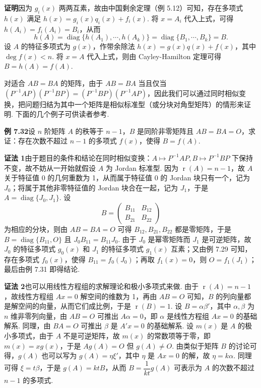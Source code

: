 \documentclass[UTF8,12pt,a4paper,fontset=fandol]{ctexart}
\begin{document}
\noindent\textbf{证明}\quad 因为 $g_i(x)$ 两两互素，故由中国剩余定理（例 5.12）可知，存在多项式 $h(x)$ 满足 $h(x)=g_i(x)q_i(x)+f_i(x)$. 将 $x=A_i$ 代入上式，可得 $h(A_i)=f_i(A_i)=B_i$，从而
\[
h(A)=\operatorname{diag}\{h(A_1),\cdots,h(A_k)\}
=\operatorname{diag}\{B_1,\cdots,B_k\}=B.
\]
设 $A$ 的特征多项式为 $g(x)$，作带余除法 $h(x)=g(x)q(x)+f(x)$，其中 $\deg f(x)<n$. 将 $x=A$ 代入上式，则由 Cayley-Hamilton 定理可得 $B=h(A)=f(A)$.

对适合 $AB=BA$ 的矩阵，由于 $AB=BA$ 当且仅当 $(P^{-1}AP)(P^{-1}BP)=(P^{-1}BP)(P^{-1}AP)$，因此我们可以通过同时相似变换，把问题归结为其中一个矩阵是相似标准型（或分块对角型矩阵）的情形来证明. 下面的几个例子可供读者参考.

\noindent\textbf{例 7.32}\quad 设 $n$ 阶矩阵 $A$ 的秩等于 $n-1$，$B$ 是同阶非零矩阵且 $AB=BA=O$，求证：存在次数不超过 $n-1$ 的多项式 $f(x)$，使得 $B=f(A)$.

\noindent\textbf{证法 1}\quad 由于题目的条件和结论在同时相似变换：$A\mapsto P^{-1}AP,B\mapsto P^{-1}BP$ 下保持不变，故不妨从一开始就假设 $A$ 为 Jordan 标准型. 因为 $\operatorname{r}(A)=n-1$，故 $A$ 关于特征值 0 的几何重数为 1，从而属于特征值 0 的 Jordan 块只有一个，记为 $J_0$；将属于其他非零特征值的 Jordan 块合在一起，记为 $J_1$，于是 $A=\operatorname{diag}\{J_0,J_1\}$. 设
\[
B=\left(\begin{array}{cc}
B_{11} & B_{12}\\
B_{21} & B_{22}
\end{array}\right)
\]
为相应的分块，则由 $AB=BA=O$ 可得 $B_{12},B_{21},B_{22}$ 都是零矩阵，于是 $B=\operatorname{diag}\{B_{11},O\}$ 且 $J_0B_{11}=B_{11}J_0$. 由于 $J_0$ 是幂零矩阵而 $J_1$ 是可逆矩阵，故 $J_0$ 的特征多项式 $g_0(x)$ 和 $J_1$ 的特征多项式 $g_1(x)$ 互素；又由例 7.29 可知，存在多项式 $f_0(x)$，使得 $B_{11}=f_0(J_0)$；再取 $f_1(x)=0$，则 $O=f_1(J_1)$；最后由例 7.31 即得结论.

\noindent\textbf{证法 2}\quad 也可以用线性方程组的求解理论和极小多项式来做. 由于 $\operatorname{r}(A)=n-1$，故线性方程组 $Ax=0$ 解空间的维数为 1，再由 $AB=O$ 可知，$B$ 的列向量都是解空间的向量，从而它们成比例，于是 $\operatorname{r}(B)=1$. 设 $B=\alpha\beta'$，其中 $\alpha,\beta$ 为 $n$ 维非零列向量，由 $AB=O$ 可推出 $A\alpha=0$，即 $\alpha$ 是线性方程组 $Ax=0$ 的基础解系. 同理，由 $BA=O$ 可推出 $\beta$ 是 $A'x=0$ 的基础解系. 设 $m(x)$ 是 $A$ 的极小多项式，由于 $A$ 不是可逆矩阵，故 $m(x)$ 的常数项等于零，即 $m(x)=xg(x)$，于是 $Ag(A)=O$ 但 $g(A)\ne O$. 由类似于矩阵 $B$ 的讨论可得，$g(A)$ 也可以写为 $g(A)=\eta\xi'$，其中 $\eta$ 是 $Ax=0$ 的解，故 $\eta=k\alpha$. 同理可得 $\xi=t\beta$，于是 $g(A)=ktB$，从而 $B=\dfrac{1}{kt}g(A)$ 可表示为 $A$ 的次数不超过 $n-1$ 的多项式.
\end{document}
